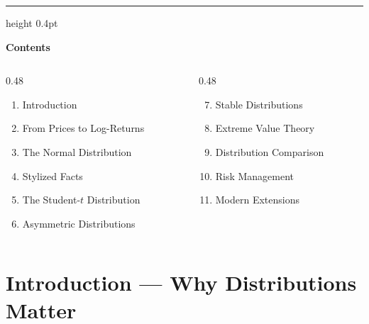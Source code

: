 \documentclass[9pt, aspectratio=169, t]{beamer}
\theoremstyle{definition}
\begin{document}
{
\begin{frame}{}
    {\color{FooterGray}\hrule height 0.4pt}
    \vspace{0.1cm}
    {\Large\textcolor{IDAred}{\textbf{Contents}}}
    \vspace{0.2cm}
    {\small
    \begin{columns}[T]
        \begin{column}{0.48\textwidth}
            \begin{enumerate}
                \item Introduction
                \item From Prices to Log-Returns
                \item The Normal Distribution
                \item Stylized Facts
                \item The Student-$t$ Distribution
                \item Asymmetric Distributions
            \end{enumerate}
        \end{column}
        \begin{column}{0.48\textwidth}
            \begin{enumerate}\setcounter{enumi}{6}
                \item Stable Distributions
                \item Extreme Value Theory
                \item Distribution Comparison
                \item Risk Management
                \item Modern Extensions
            \end{enumerate}
        \end{column}
    \end{columns}
    }
\end{frame}
}

\section{Introduction --- Why Distributions Matter}
\end{document}
